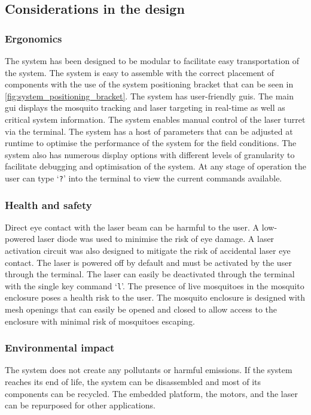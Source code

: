 \subsection{Considerations in the design}
\subsubsection{Ergonomics}
The system has been designed to be modular to facilitate easy transportation of the system. The system is easy to assemble with the correct placement of components with the use of the system positioning bracket that can be seen in \autoref{fig:system_positioning_bracket}. The system has user-friendly \glspl{gui}. The main \gls{gui} displays the mosquito tracking and laser targeting in real-time as well as critical system information. The system enables manual control of the laser turret via the terminal. The system has a host of parameters that can be adjusted at runtime to optimise the performance of the system for the field conditions. The system also has numerous display options with different levels of granularity to facilitate debugging and optimisation of the system. At any stage of operation the user can type `\texttt{?}' into the terminal to view the current commands available.

\subsubsection{Health and safety}
Direct eye contact with the laser beam can be harmful to the user. A low-powered laser diode was used to minimise the risk of eye damage. A laser activation circuit was also designed to mitigate the risk of accidental laser eye contact. The laser is powered off by default and must be activated by the user through the terminal. The laser can easily be deactivated through the terminal with the single key command `\texttt{l}'. The presence of live mosquitoes in the mosquito enclosure poses a health risk to the user. The mosquito enclosure is designed with mesh openings that can easily be opened and closed to allow access to the enclosure with minimal risk of mosquitoes escaping.

\subsubsection{Environmental impact}
The system does not create any pollutants or harmful emissions. If the system reaches its end of life, the system can be disassembled and most of its components can be recycled. The embedded platform, the motors, and the laser can be repurposed for other applications.

